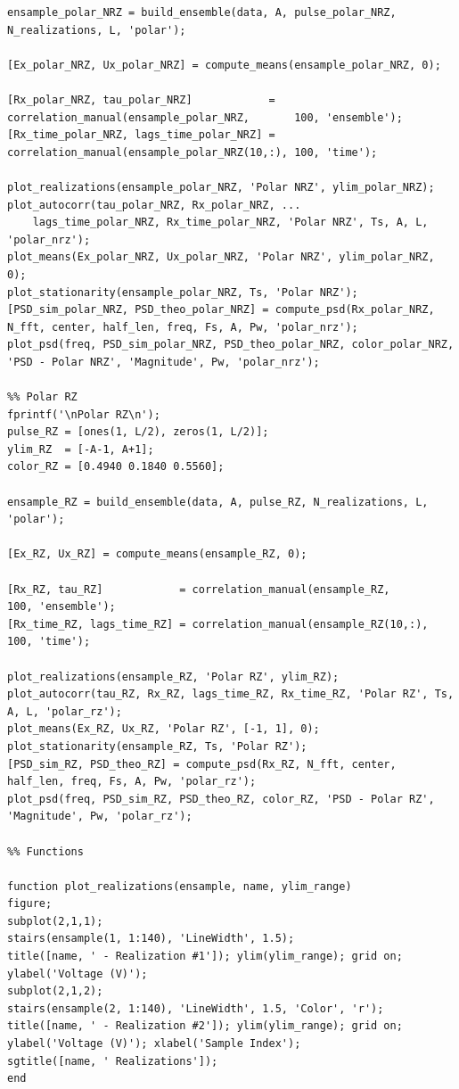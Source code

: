 \begin{longlisting}
\begin{verbatim}
ensample_polar_NRZ = build_ensemble(data, A, pulse_polar_NRZ, N_realizations, L, 'polar');

[Ex_polar_NRZ, Ux_polar_NRZ] = compute_means(ensample_polar_NRZ, 0);

[Rx_polar_NRZ, tau_polar_NRZ]            = correlation_manual(ensample_polar_NRZ,       100, 'ensemble');
[Rx_time_polar_NRZ, lags_time_polar_NRZ] = correlation_manual(ensample_polar_NRZ(10,:), 100, 'time');

plot_realizations(ensample_polar_NRZ, 'Polar NRZ', ylim_polar_NRZ);
plot_autocorr(tau_polar_NRZ, Rx_polar_NRZ, ...
    lags_time_polar_NRZ, Rx_time_polar_NRZ, 'Polar NRZ', Ts, A, L, 'polar_nrz');
plot_means(Ex_polar_NRZ, Ux_polar_NRZ, 'Polar NRZ', ylim_polar_NRZ, 0);
plot_stationarity(ensample_polar_NRZ, Ts, 'Polar NRZ');
[PSD_sim_polar_NRZ, PSD_theo_polar_NRZ] = compute_psd(Rx_polar_NRZ, N_fft, center, half_len, freq, Fs, A, Pw, 'polar_nrz');
plot_psd(freq, PSD_sim_polar_NRZ, PSD_theo_polar_NRZ, color_polar_NRZ, 'PSD - Polar NRZ', 'Magnitude', Pw, 'polar_nrz');

%% Polar RZ
fprintf('\nPolar RZ\n');
pulse_RZ = [ones(1, L/2), zeros(1, L/2)];
ylim_RZ  = [-A-1, A+1];
color_RZ = [0.4940 0.1840 0.5560];

ensample_RZ = build_ensemble(data, A, pulse_RZ, N_realizations, L, 'polar');

[Ex_RZ, Ux_RZ] = compute_means(ensample_RZ, 0);

[Rx_RZ, tau_RZ]            = correlation_manual(ensample_RZ,       100, 'ensemble');
[Rx_time_RZ, lags_time_RZ] = correlation_manual(ensample_RZ(10,:), 100, 'time');

plot_realizations(ensample_RZ, 'Polar RZ', ylim_RZ);
plot_autocorr(tau_RZ, Rx_RZ, lags_time_RZ, Rx_time_RZ, 'Polar RZ', Ts, A, L, 'polar_rz');
plot_means(Ex_RZ, Ux_RZ, 'Polar RZ', [-1, 1], 0);
plot_stationarity(ensample_RZ, Ts, 'Polar RZ');
[PSD_sim_RZ, PSD_theo_RZ] = compute_psd(Rx_RZ, N_fft, center, half_len, freq, Fs, A, Pw, 'polar_rz');
plot_psd(freq, PSD_sim_RZ, PSD_theo_RZ, color_RZ, 'PSD - Polar RZ', 'Magnitude', Pw, 'polar_rz');

%% Functions

function plot_realizations(ensample, name, ylim_range)
figure;
subplot(2,1,1);
stairs(ensample(1, 1:140), 'LineWidth', 1.5);
title([name, ' - Realization #1']); ylim(ylim_range); grid on; ylabel('Voltage (V)');
subplot(2,1,2);
stairs(ensample(2, 1:140), 'LineWidth', 1.5, 'Color', 'r');
title([name, ' - Realization #2']); ylim(ylim_range); grid on;
ylabel('Voltage (V)'); xlabel('Sample Index');
sgtitle([name, ' Realizations']);
end


\end{verbatim}
\end{longlisting}
